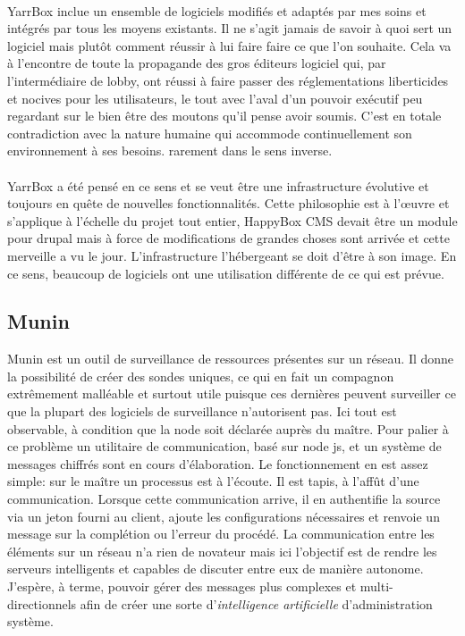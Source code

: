 \documentclass[11pt, a4paper ]{article}
\begin{document}
\begin{spacing}{1.5}
\paragraph{}
YarrBox inclue un ensemble de logiciels modifiés et adaptés par mes soins et intégrés par tous les moyens existants. Il ne s'agit jamais de savoir à quoi sert un logiciel mais plutôt comment réussir à lui faire faire ce que l'on souhaite. Cela va à l'encontre de toute la propagande des gros éditeurs logiciel qui, par l'intermédiaire de lobby, ont réussi à faire passer des réglementations liberticides et nocives pour les utilisateurs, le tout avec l'aval d'un pouvoir exécutif peu regardant sur le bien être des moutons qu'il pense avoir soumis. C'est en totale contradiction avec la nature humaine qui accommode continuellement son environnement à ses besoins. rarement dans le sens inverse.
\paragraph{}
YarrBox a été pensé en ce sens et se veut être une infrastructure évolutive et toujours en quête de nouvelles fonctionnalités. Cette philosophie est à l’œuvre et s'applique à l’échelle du projet tout entier, HappyBox CMS devait être un module pour drupal mais à force de modifications de grandes choses sont arrivée et cette merveille a vu le jour. L'infrastructure l’hébergeant se doit d'être à son image. En ce sens, beaucoup de logiciels ont une utilisation différente de ce qui est prévue.
\subsection{Munin}
Munin est un outil de surveillance de ressources présentes sur un réseau. Il donne la possibilité de créer des sondes uniques, ce qui en fait un compagnon extrêmement malléable et surtout utile puisque ces dernières peuvent surveiller ce que la plupart des logiciels de surveillance n'autorisent pas. Ici tout est observable, à  condition que la node soit déclarée auprès du maître. Pour palier à ce problème un utilitaire de communication, basé sur node js, et un système de messages chiffrés sont en cours d'élaboration.
Le fonctionnement en est assez simple: sur le maître un processus est à l'écoute. Il est tapis, à l’affût d'une communication. Lorsque cette communication arrive, il en authentifie la source via un jeton fourni au client, ajoute les configurations nécessaires et renvoie un message sur la complétion ou l'erreur du procédé. La communication entre les éléments sur un réseau n'a rien de novateur mais ici l'objectif est de rendre les serveurs intelligents et capables de discuter entre eux de manière autonome. J'espère, à terme, pouvoir gérer des messages plus complexes et multi-directionnels afin de créer une sorte d'\emph{intelligence artificielle} d'administration système.

\end{spacing}
\end{document}
